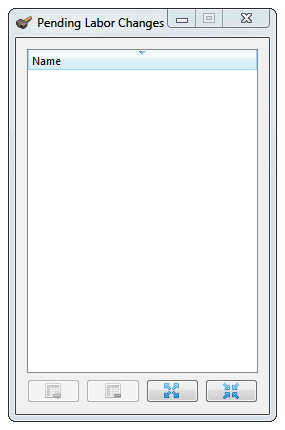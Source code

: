 \documentclass[]{article}
\begin{document}
\begin{itemize}
\begin{figure}[h!]
\begin{subfigure}[C]{0.45\linewidth}
                \includegraphics[width=.8\textwidth]{Sec1Fig16-2}
        \end{subfigure}
\end{figure}



\end{itemize}
\end{document}
